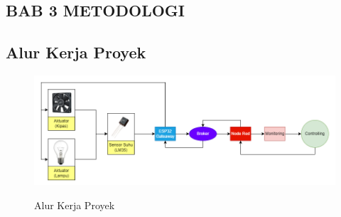 \begin{center}
    \section*{BAB 3 METODOLOGI}
\end{center}

\setcounter{section}{3}
\setcounter{subsection}{0}

\subsection{Alur Kerja Proyek}
    \begin{figure}[htp]
         \centering
         \includegraphics[width=15cm]{image/Diagram Cara Kerja.png}
         \label{fig:alur kerja}
         \caption{Alur Kerja Proyek}
    \end{figure}

